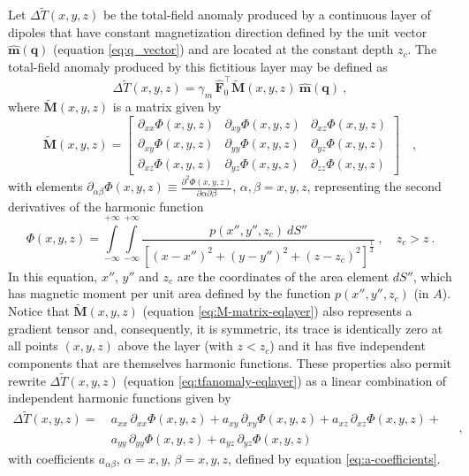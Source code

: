 Let $\Delta \tilde{T}(x, y, z)$ be the total-field anomaly produced by a 
continuous layer of dipoles that have constant magnetization direction defined by
the unit vector $\hat{\mathbf{m}}(\mathbf{q})$ (equation \ref{eq:q_vector})
and are located at the constant depth $z_{c}$. The total-field anomaly produced
by this fictitious layer may be defined as
\begin{equation}
	\Delta \tilde{T}(x, y, z) = \gamma_{m} \, \hat{\mathbf{F}}_{0}^{\top} 
	\tilde{\mathbf{M}}(x, y, z) \: \hat{\mathbf{m}}(\mathbf{q}) \: ,
	\label{eq:tfanomaly-eqlayer}
\end{equation}
where $\tilde{\mathbf{M}}(x, y, z)$ is a matrix given by
\begin{equation}
	\tilde{\mathbf{M}}(x, y, z) = \begin{bmatrix}
		\partial_{xx} \Phi(x, y, z) & 
		\partial_{xy} \Phi(x, y, z) &
		\partial_{xz} \Phi(x, y, z) \\
		\partial_{xy} \Phi(x, y, z) & 
		\partial_{yy} \Phi(x, y, z) &
		\partial_{yz} \Phi(x, y, z) \\
		\partial_{xz} \Phi(x, y, z) & 
		\partial_{yz} \Phi(x, y, z) &
		\partial_{zz} \Phi(x, y, z)
	\end{bmatrix} \quad ,
	\label{eq:M-matrix-eqlayer}
\end{equation}
with elements
$\partial_{\alpha\beta} \Phi(x, y, z) \equiv 
\frac{\partial^{2} \Phi(x, y, z)}{\partial \alpha \partial \beta}$, 
$\alpha, \beta = x, y, z$, representing the second derivatives of the harmonic
function
\begin{equation}
	\Phi(x, y, z) = \int\limits_{-\infty}^{+\infty}\int\limits_{-\infty}^{+\infty}
	\frac{p(x'', y'', z_{c}) \: dS''}
	{\left[ (x-x'')^2 + (y-y'')^2 + (z-z_{c})^2 \right]^{\frac{1}{2}}} \: ,
	\quad z_{c} > z \: .
	\label{eq:Phi-surface-integral}
\end{equation}
In this equation, $x''$, $y''$ and $z_{c}$ are the coordinates 
of the area element $dS''$, which has magnetic moment per unit area
defined by the function $p(x'', y'', z_{c})$ (in $A$).
Notice that $\tilde{\mathbf{M}}(x, y, z)$ (equation \ref{eq:M-matrix-eqlayer}) also represents
a gradient tensor \citep{pedersen_rasmussen1990} and, consequently, it is symmetric, 
its trace is identically zero at all points $(x, y, z)$ above the layer (with $z < z_{c}$) 
and it has five independent components that are themselves harmonic functions.
These properties also permit rewrite $\Delta \tilde{T}(x, y, z)$ 
(equation \ref{eq:tfanomaly-eqlayer}) as a linear combination of independent
harmonic functions given by
\begin{equation}
	\begin{split}
		\Delta \tilde{T}(x, y, z) = \:
		& a_{xx} \, \partial_{xx} \Phi(x, y, z) + 
		a_{xy} \, \partial_{xy} \Phi(x, y, z) + 
		a_{xz} \, \partial_{xz} \Phi(x, y, z) + \\
		& a_{yy} \, \partial_{yy} \Phi(x, y, z) + 
		a_{yz} \, \partial_{yz} \Phi(x, y, z)
		\end{split} \quad ,
	\label{eq:tfanomaly-eqlayer-alternative}
\end{equation}
with coefficients $a_{\alpha\beta}$, $\alpha = x, y$, $\beta = x, y, z$, defined by
equation \ref{eq:a-coefficients}.

